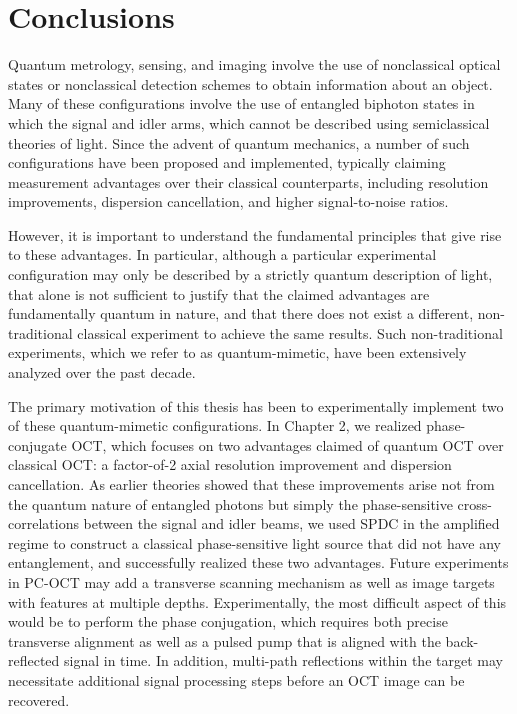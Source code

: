\chapter{Conclusions}

Quantum metrology, sensing, and imaging involve the use of nonclassical optical states or nonclassical detection schemes to obtain information about an object. Many of these configurations involve the use of entangled biphoton states in which the signal and idler arms, which cannot be described using semiclassical theories of light. Since the advent of quantum mechanics, a number of such configurations have been proposed and implemented, typically claiming measurement advantages over their classical counterparts, including resolution improvements, dispersion cancellation, and higher signal-to-noise ratios.

However, it is important to understand the fundamental principles that give rise to these advantages. In particular, although a particular experimental configuration may only be described by a strictly quantum description of light, that alone is not sufficient to justify that the claimed advantages are fundamentally quantum in nature, and that there does not exist a different, non-traditional classical experiment to achieve the same results. Such non-traditional experiments, which we refer to as quantum-mimetic, have been extensively analyzed over the past decade.

The primary motivation of this thesis has been to experimentally implement two of these quantum-mimetic configurations. In Chapter 2, we realized phase-conjugate OCT, which focuses on two advantages claimed of quantum OCT over classical OCT: a factor-of-2 axial resolution improvement and dispersion cancellation. As earlier theories showed that these improvements arise not from the quantum nature of entangled photons but simply the phase-sensitive cross-correlations between the signal and idler beams, we used SPDC in the amplified regime to construct a classical phase-sensitive light source that did not have any entanglement, and successfully realized these two advantages. Future experiments in PC-OCT may add a transverse scanning mechanism as well as image targets with features at multiple depths. Experimentally, the most difficult aspect of this would be to perform the phase conjugation, which requires both precise transverse alignment as well as a pulsed pump that is aligned with the back-reflected signal in time. In addition, multi-path reflections within the target may necessitate additional signal processing steps before an OCT image can be recovered.

